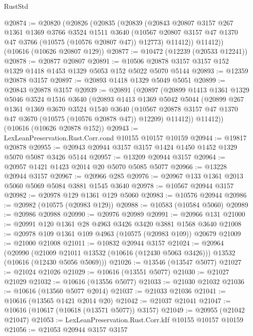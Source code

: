 \begin{lexlean}{RustStd}
\begin{coremodule}
@20874 := @20820
    (@20826
      (@20835
        (@20839
          (@20843
            @20807
            @3157
            @267
            @1361
            @1369
            @3766
            @3524
            @1511
            @3640
            (@10567 @20807 @3157 @47 @1370 @47 @3766 (@10575 (@10576 @20807 @47)) @12773)
            @11412))
        @11412))
    (@10616 (@10626 @20807 @129))
@20877 := @10472 (@12239 (@20533 @12241))
@20878 := @20877 @20807
@20891 := @10506 @20878 @3157 @3157 @152 @1329 @1418 @1453 @1329 @5053 @152 @5022 @5070 @5144
@20893 := @12359 @20878 @3157
@20897 := @20893 @1418 @1329 @5049 @5051
@20899 := @20843 @20878 @3157
@20939 := @20891
    (@20897
      (@20899
        @1413
        @1361
        @1329
        @5046
        @3524
        @1516
        @3640
        (@20893
          @1413
          @1369
          @5042
          @5044
          (@20899
            @267
            @1361
            @1369
            @3670
            @3524
            @1540
            @3640
            (@10567 @20878 @3157 @47 @1370 @47 @3670 (@10575 (@10576 @20878 @47)) @12209)
            @11412))
        @11412))
    (@10616 (@10626 @20878 @152))
@20943 := LexLeanPreservation.Rust.Corr.cond @10155 @10157 @10159
@20944 := @19817 @20878
@20955 := @20943 @20944 @3157 @3157 @1424 @1450 @1452 @1329 @5070 @5087 @3426 @5144
@20957 := @13209 @20944 @3157
@20964 := @20957 @1421 @1423 @2014 @20 @5070 @5085 @5077
@20966 := @13228 @20944 @3157
@20967 := @20966 @285
@20976 := @20967 @133 @1361 @2013 @5060 @5069 @5084 @3881 @1545 @3640
@20978 := @10567 @20944 @3157
@20982 := @20978 @129 @1361 @129 @5060
@20983 := @10576 @20944
@20986 := @20982 (@10575 (@20983 @129))
@20988 := @10583 (@10584 @5060)
@20989 := @20986 @20988
@20990 := @20976 @20989
@20991 := @20966 @131
@21000 := @20991 @120 @1361 @28 @4963 @3426 @3420 @3881 @1568 @3640
@21008 := @20978 @109 @1361 @109 @4963 (@10575 (@20983 @109)) @20679
@21009 := @21000 @21008
@21011 := @10832 @20944 @3157
@21024 := @20964
    (@20990
      (@21009 @21011 @13532 (@10616 (@12430 @5063 @3426)))
      @13532
      (@10616 (@12430 @5056 @5069)))
@21026 := @13546 (@13547 @5077)
@21027 := @21024 @21026
@21029 := @10616 (@13551 @5077)
@21030 := @21027 @21029
@21032 := @10616 (@13556 @5077)
@21033 := @21030 @21032
@21036 := @10616 (@13560 @5077 @2014)
@21037 := @21033 @21036
@21041 := @10616 (@13565 @1421 @2014 @20)
@21042 := @21037 @21041
@21047 := @10616 (@10617 (@10618 (@13571 @5077)) @3157)
@21049 := @20955 (@21042 @21047)
@21053 := LexLeanPreservation.Rust.Corr.kIf @10155 @10157 @10159
@21056 := @21053 @20944 @3157 @3157

\end{coremodule}
\end{lexlean}
